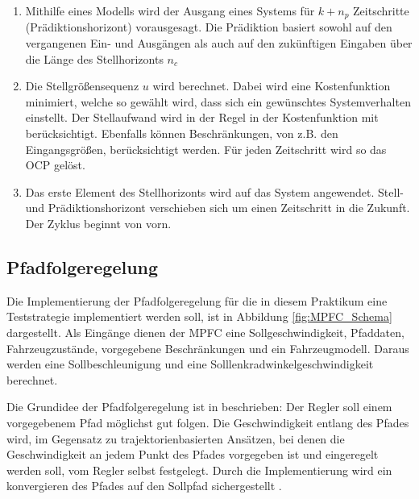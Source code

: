 \begin{enumerate}
    \item Mithilfe eines Modells wird der Ausgang eines Systems für $k+n_{p}$ Zeitschritte (Prädiktionshorizont) vorausgesagt. Die Prädiktion basiert sowohl auf den vergangenen Ein- und Ausgängen als auch auf den zukünftigen Eingaben über die Länge des Stellhorizonts $n_{c}$
    \item Die Stellgrößensequenz $u$ wird berechnet. Dabei wird eine Kostenfunktion minimiert, welche so gewählt wird, dass sich ein gewünschtes Systemverhalten einstellt. Der Stellaufwand wird in der Regel in der Kostenfunktion mit berücksichtigt. Ebenfalls können Beschränkungen, von z.B. den Eingangsgrößen, berücksichtigt werden. Für jeden Zeitschritt wird so das OCP gelöst.
    \item Das erste Element des Stellhorizonts wird auf das System angewendet. Stell- und Prädiktionshorizont verschieben sich um einen Zeitschritt in die Zukunft. Der Zyklus beginnt von vorn. 
\end{enumerate}
\subsection{Pfadfolgeregelung}
Die Implementierung der Pfadfolgeregelung für die in diesem Praktikum eine Teststrategie implementiert werden soll, ist in Abbildung \ref{fig:MPFC_Schema} dargestellt. Als Eingänge dienen der MPFC eine Sollgeschwindigkeit, Pfaddaten, Fahrzeugzustände, vorgegebene Beschränkungen und ein Fahrzeugmodell. Daraus werden eine Sollbeschleunigung und eine Solllenkradwinkelgeschwindigkeit berechnet.

Die Grundidee der Pfadfolgeregelung ist in \cite{Faulwasser2009} beschrieben: Der Regler soll einem vorgegebenem Pfad möglichst gut folgen. Die Geschwindigkeit entlang des Pfades wird, im Gegensatz zu trajektorienbasierten Ansätzen, bei denen die Geschwindigkeit an jedem Punkt des Pfades vorgegeben ist und eingeregelt werden soll, vom Regler selbst festgelegt. Durch die Implementierung wird ein konvergieren des Pfades auf den Sollpfad sichergestellt \cite{ritschel2019}.

